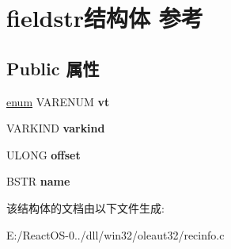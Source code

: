 \hypertarget{structfieldstr}{}\section{fieldstr结构体 参考}
\label{structfieldstr}
\subsection*{Public 属性}
\begin{DoxyCompactItemize}
\item 
\mbox{\label{structfieldstr_ac21693319fe139252644897ef9154e15}} 
\hyperlink{interfaceenum}{enum} V\+A\+R\+E\+N\+UM {\bfseries vt}
\item 
\mbox{\label{structfieldstr_a90786f1b7a049103a8ac26081f9077df}} 
V\+A\+R\+K\+I\+ND {\bfseries varkind}
\item 
\mbox{\label{structfieldstr_ad8e6ac9a693b9f57a5b7cb4c869ae290}} 
U\+L\+O\+NG {\bfseries offset}
\item 
\mbox{\label{structfieldstr_a6cb71b4cc2c062ac1e801fb7b77b5d95}} 
B\+S\+TR {\bfseries name}
\end{DoxyCompactItemize}


该结构体的文档由以下文件生成\+:\begin{DoxyCompactItemize}
\item 
E\+:/\+React\+O\+S-\/0../dll/win32/oleaut32/recinfo.\+c\end{DoxyCompactItemize}
